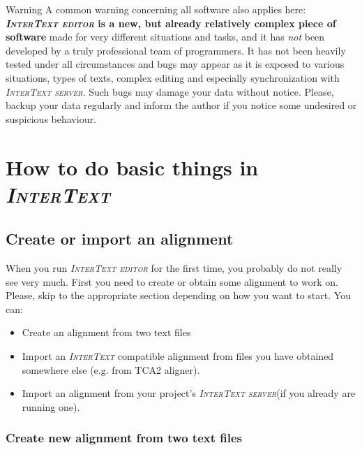 \documentclass[a4paper,10pt,oneside]{book}
\newcommand{\IT}{\textit{\textsc{InterText}}\xspace}
\newcommand{\ITeditor}{\textit{\textsc{InterText editor}}\xspace}
\newcommand{\ITserver}{\textit{\textsc{InterText server}}\xspace}
\begin{document}
\medskip
\begin{bclogo}[couleur = blue!30, arrondi = 0.1, logo = \bcattention,
ombre = true , epOmbre = 0.125, couleurOmbre = black!30, blur, epBord = 0.3, marge = 5]{Warning}\small
A common warning concerning all software also applies here: \textbf{\ITeditor is a new, but already relatively complex piece of software} made for very different situations and tasks, and it has \emph{not} been developed by a truly professional team of programmers. It has not been heavily tested under all circumstances and bugs may appear as it is exposed to various situations, types of texts, complex editing and especially synchronization with \ITserver. Such bugs may damage your data without notice. Please, backup your data regularly and inform the author if you notice some undesired or suspicious behaviour.
\end{bclogo}


\part{How to do basic things in \IT}\label{ch:howto}

\chapter{Create or import an alignment}\label{ch:howto:newalignment}

When you run \ITeditor for the first time, you probably do not really see very much. First you need to create or obtain some alignment to work on. Please, skip to the appropriate section depending on how you want to start. You can:
\begin{itemize}
	\item Create an alignment from two text files
	\item Import an \IT compatible alignment from files you have obtained somewhere else (e.g. from TCA2 aligner).
	\item Import an alignment from your project's \ITserver (if you already are running one).
\end{itemize}

\section{Create new alignment from two text files}\label{ch:howto:createfromtext}
\end{document}
